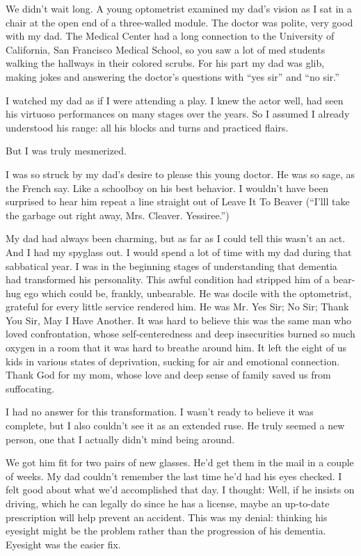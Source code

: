 \documentclass[12pt]{book}
\begin{document}
We didn't wait long. A young optometrist examined my dad's vision as I sat in a chair at the open end of a three-walled module. The doctor was polite, very good with my dad. The Medical Center had a long connection to the University of California, San Francisco Medical School, so you saw a lot of med students walking the hallways in their colored scrubs. For his part my dad was glib, making jokes and answering the doctor's questions with ``yes sir'' and ``no sir.''

I watched my dad as if I were attending a play. I knew the actor well, had seen his virtuoso performances on many stages over the years. So I assumed I already understood his range: all his blocks and turns and practiced flairs.

But I was truly mesmerized.

I was so struck by my dad's desire to please this young doctor. He was so sage, as the French say. Like a schoolboy on his best behavior. I wouldn't have been surprised to hear him repeat a line straight out of Leave It To Beaver (``I'lll take the garbage out right away, Mrs. Cleaver. Yessiree.'')

My dad had always been charming, but as far as I could tell this wasn't an act. And I had my spyglass out. I would spend a lot of time with my dad during that sabbatical year. I was in the beginning stages of understanding that dementia had transformed his personality. This awful condition had stripped him of a bear-hug ego which could be, frankly, unbearable. He was docile with the optometrist, grateful for every little service rendered him. He was Mr. Yes Sir; No Sir; Thank You Sir, May I Have Another. It was hard to believe this was the same man who loved confrontation, whose self-centeredness and deep insecurities burned so much oxygen in a room that it was hard to breathe around him. It left the eight of us kids in various states of deprivation, sucking for air and emotional connection. Thank God for my mom, whose love and deep sense of family saved us from suffocating.

I had no answer for this transformation. I wasn't ready to believe it was complete, but I also couldn't see it as an extended ruse. He truly seemed a new person, one that I actually didn't mind being around.

We got him fit for two pairs of new glasses. He'd get them in the mail in a couple of weeks. My dad couldn't remember the last time he'd had his eyes checked. I felt good about what we'd accomplished that day. I thought: Well, if he insists on driving, which he can legally do since he has a license, maybe an up-to-date prescription will help prevent an accident. This was my denial: thinking his eyesight might be the problem rather than the progression of his dementia. Eyesight was the easier fix.
\end{document}
